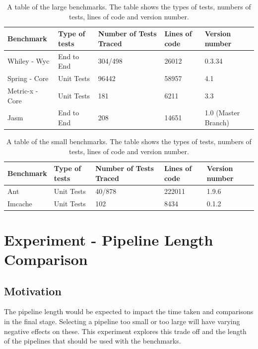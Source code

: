 \begin{table}[H]
\centering
\begin{tabular}{|l|l|l|l|l|}
\hline
{\bf Benchmark}    & {\bf Type of tests}   &  {\bf Number of Tests Traced} & {\bf Lines of code} & {\bf Version number}   \\ \hline
Whiley - Wyc      & End to End  &    304/498   &   26012       &       0.3.34   \\ \hline
Spring - Core   & Unit Tests  &  96442  &    58957      & 4.1 \\ \hline
Metric-x - Core &  Unit Tests  &  181 &    6211      & 3.3 \\ \hline
Jasm              &   End to End   &  208     &     14651     & 1.0 (Master Branch) \\ \hline

\end{tabular}
\caption{A table of the large benchmarks. The table shows the types of tests, numbers of tests, lines of code and version number.}
\label{large_test}
\end{table}

\begin{table}[H]
\centering
\begin{tabular}{|l|l|l|l|l|}
\hline
{\bf Benchmark} & {\bf Type of tests}   & {\bf Number of Tests Traced} & {\bf Lines of code} & {\bf Version number}  \\ \hline
Ant             &   Unit Tests    &     40/878     & 222011 & 1.9.6 \\ \hline
Imcache &       Unit Tests    &    102        & 8434  & 0.1.2 \\ \hline
\end{tabular}
\caption{A table of the small benchmarks. The table shows the types of tests, numbers of tests, lines of code and version number.}
\label{small_test}
\end{table}

\section{Experiment  - Pipeline Length Comparison }
\label{sec:pipelineEva}

\subsection{Motivation}
The pipeline length would be expected to impact the time taken and comparisons in the final stage. Selecting a pipeline too small or too large will have varying negative effects on these. This experiment explores this trade off and the length of the pipelines that should be used with the benchmarks.

